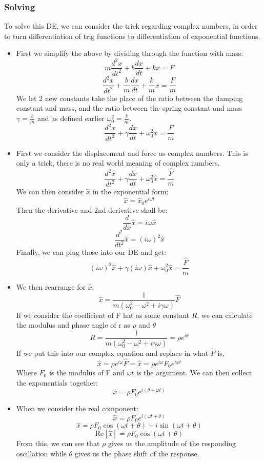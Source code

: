 \documentclass[10pt]{report}
\begin{document}
{\subsubsection{Solving}
\par{To solve this DE, we can consider the trick regarding complex numbers, in order to turn differentiation of trig functions to differentiation of exponential functions. 
\begin{itemize}
	\item{First we simplify the above by dividing through the function with mass: 
			\[
				m\frac{d^{2}x}{dt^{2}}+b\frac{dx}{dt}+kx=F
			\] \[
				\frac{d^{2}x}{dt^{2}}+\frac{b}{m}\frac{dx}{dt}+\frac{k}{m}x=\frac{F}{m}
			\] We let 2 new constants take the place of the ratio between the damping constant and mass, and the ratio between the spring constant and mass $\gamma=\frac{b}{m}$ and as defined earlier $\omega_{0}^{2}=\frac{k}{m}$. \[
				\frac{d^{2}x}{dt^{2}}+\gamma\frac{dx}{dt}+\omega_{0}^{2}x=\frac{F}{m}
			\] 
	 }
	\item{First we consider the displacement and force as complex numbers. This is only a trick, there is no real world meaning of complex numbers.\[
				\frac{d^{2}\hat{x}}{dt^{2}}+\gamma\frac{d\hat{x}}{dt}+\omega_{0}^{2}\hat{x}=\frac{\hat{F}}{m}
		\] We can then consider $\hat{x}$ in the exponential form:  \[
		\hat{x}=\hat{x}_{0}e^{i\omega t}
		\] Then the derivative and 2nd derivative shall be: \[
		\frac{d}{dx}\hat{x}=i\omega\hat{x} 
		\] \[
		\frac{d^{2}}{dt^{2}}\hat{x}=\left(i\omega\right)^{2}\hat{x}	
		\] Finally, we can plug those into our DE and get: \[
		\left(i\omega\right)^{2}\hat{x}+\gamma\left(i\omega\right)\hat{x}+\omega_{0}^{2}\hat{x}=\frac{\hat{F}}{m}
		\]}
	\item{We then rearrange for $\hat{x}$:  \[
				\hat{x}=\frac{1}{m\left(\omega_{0}^{2}-\omega^{2}+i\gamma\omega\right)}\hat{F}
	\] If we consider the coefficient of F hat as some constant $R$, we can calculate the modulus and phase angle of r as $\rho$ and $\theta$\[
	R=\frac{1}{m\left(\omega_{0}^{2}-\omega^{2}+i\gamma\omega\right)}=\rho e^{i\theta}
\] If we put this into our complex equation and replace in what $\hat{F}$ is, \[
\hat{x}=\rho e^{i\omega}\hat{F}=
\hat{x}=\rho e^{i\omega}F_{0}e^{i\omega t}
\] Where $F_{0}$ is the modulus of F and $\omega t$ is the argument. We can then collect the exponentials together: \[
\hat{x}=\rho F_{0}e^{i\left(\theta+\omega t\right)}
\]} 
	\item{When we consider the real component: \[
			\hat{x}=\rho F_{0}e^{i\left(\omega t+\theta\right)}
\] \[
			\hat{x}=\rho F_{0}\cos\left(\omega t+\theta\right)+i\sin\left(\omega t+\theta\right)
\] \[
			\mathrm{Re}\left[\hat{x}\right]=\rho F_{0}\cos\left(\omega t+\theta\right)
	\] From this, we can see that $\rho$ gives us the amplitude of the responding oscillation while $\theta$ gives us the phase shift of the response.}
\end{itemize}}
}
\end{document}
